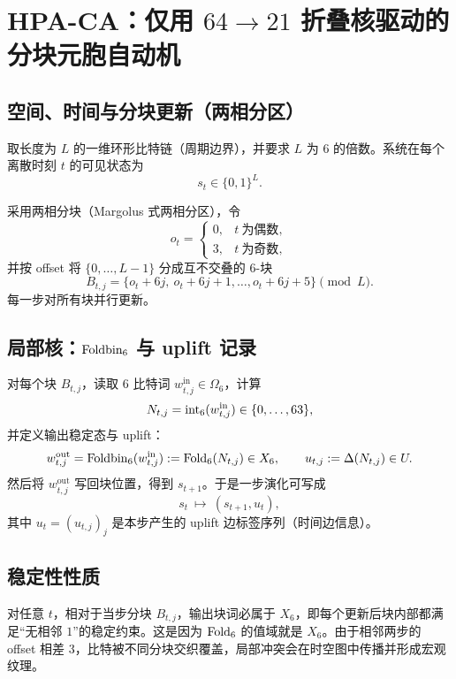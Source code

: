 
\section{HPA-CA：仅用 $64\to 21$ 折叠核驱动的分块元胞自动机}

\subsection{空间、时间与分块更新（两相分区）}

取长度为 $L$ 的一维环形比特链（周期边界），并要求 $L$ 为 $6$ 的倍数。系统在每个离散时刻 $t$ 的可见状态为
$$
s_t\in\{0,1\}^L.
$$

采用两相分块（Margolus 式两相分区）\cite{toffoli1987cam}，令
$$
o_t=\begin{cases}
0,& t\ \text{为偶数},\\
3,& t\ \text{为奇数},
\end{cases}
$$
并按 offset 将 $\{0,\dots,L-1\}$ 分成互不交叠的 $6$-块
$$
B_{t,j}=\{o_t+6j,\ o_t+6j+1,\dots,o_t+6j+5\}\pmod L.
$$
每一步对所有块并行更新。

\subsection{局部核：$\mathrm{Foldbin}_6$ 与 uplift 记录}

对每个块 $B_{t,j}$，读取 $6$ 比特词 $w^{\mathrm{in}}_{t,j}\in\Omega_6$，计算
$$
N_{t,j}=\mathrm{int}_6(w^{\mathrm{in}}_{t,j})\in\{0,\dots,63\},
$$
并定义输出稳定态与 uplift：
$$
w^{\mathrm{out}}_{t,j}=\mathrm{Foldbin}_6(w^{\mathrm{in}}_{t,j}):=\mathrm{Fold}_6(N_{t,j})\in X_6,
\qquad
u_{t,j}:=\Delta(N_{t,j})\in U.
$$
然后将 $w^{\mathrm{out}}_{t,j}$ 写回块位置，得到 $s_{t+1}$。于是一步演化可写成
$$
s_t\ \longmapsto\ (s_{t+1},u_t),
$$
其中 $u_t=(u_{t,j})_j$ 是本步产生的 uplift 边标签序列（时间边信息）。

\subsection{稳定性性质}

对任意 $t$，相对于当步分块 $B_{t,j}$，输出块词必属于 $X_6$，即每个更新后块内部都满足“无相邻 $1$”的稳定约束。这是因为 $\mathrm{Fold}_6$ 的值域就是 $X_6$。由于相邻两步的 offset 相差 $3$，比特被不同分块交织覆盖，局部冲突会在时空图中传播并形成宏观纹理。

